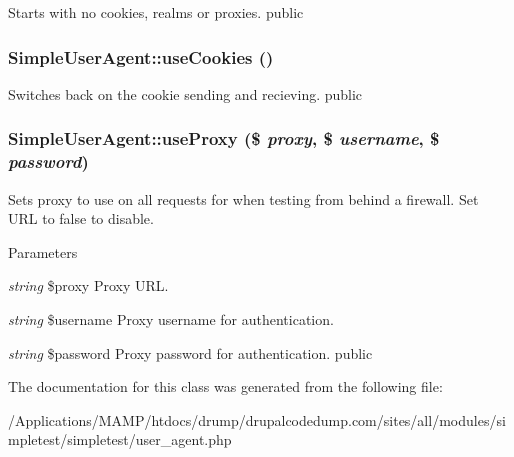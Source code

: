 Starts with no cookies, realms or proxies.  public \hypertarget{class_simple_user_agent_af43a334e83797817ba9b368a1d9f018a}{
\subsubsection[{useCookies}]{\setlength{\rightskip}{0pt plus 5cm}SimpleUserAgent::useCookies ()}}
\label{class_simple_user_agent_af43a334e83797817ba9b368a1d9f018a}
Switches back on the cookie sending and recieving.  public \hypertarget{class_simple_user_agent_aabde5dbb594c8c12756cf5b5a1732040}{
\subsubsection[{useProxy}]{\setlength{\rightskip}{0pt plus 5cm}SimpleUserAgent::useProxy (\$ {\em proxy}, \/  \$ {\em username}, \/  \$ {\em password})}}
\label{class_simple_user_agent_aabde5dbb594c8c12756cf5b5a1732040}
Sets proxy to use on all requests for when testing from behind a firewall. Set URL to false to disable. 
\begin{DoxyParams}{Parameters}
\item[{\em string}]\$proxy Proxy URL. \item[{\em string}]\$username Proxy username for authentication. \item[{\em string}]\$password Proxy password for authentication.  public \end{DoxyParams}


The documentation for this class was generated from the following file:\begin{DoxyCompactItemize}
\item 
/Applications/MAMP/htdocs/drump/drupalcodedump.com/sites/all/modules/simpletest/simpletest/user\_\-agent.php\end{DoxyCompactItemize}

